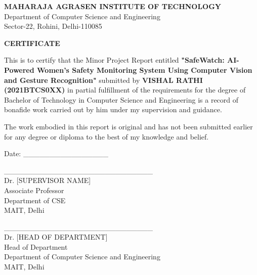 \documentclass[12pt,a4paper]{article}
\begin{document}
\newpage
\thispagestyle{empty}

\begin{center}
{\fontsize{18}{22}\bfseries MAHARAJA AGRASEN INSTITUTE OF TECHNOLOGY}\\
\vspace{0.3cm}
{\fontsize{14}{17}\selectfont Department of Computer Science and Engineering}\\
\vspace{0.5cm}
{\fontsize{14}{17}\selectfont Sector-22, Rohini, Delhi-110085}
\end{center}

\vspace{2cm}

\begin{center}
{\fontsize{16}{20}\bfseries CERTIFICATE}
\end{center}

\vspace{1.5cm}

{\fontsize{12}{15}\selectfont
This is to certify that the Minor Project Report entitled \textbf{"SafeWatch: AI-Powered Women's Safety Monitoring System Using Computer Vision and Gesture Recognition"} submitted by \textbf{VISHAL RATHI (2021BTCS0XX)} in partial fulfillment of the requirements for the degree of Bachelor of Technology in Computer Science and Engineering is a record of bonafide work carried out by him under my supervision and guidance.

\vspace{1cm}

The work embodied in this report is original and has not been submitted earlier for any degree or diploma to the best of my knowledge and belief.

\vspace{2cm}

\begin{minipage}{0.45\textwidth}
\begin{flushleft}
Date: \_\_\_\_\_\_\_\_\_\_\_\_\_\_\_\_
\end{flushleft}
\end{minipage}
\hfill
\begin{minipage}{0.45\textwidth}
\begin{flushright}
\_\_\_\_\_\_\_\_\_\_\_\_\_\_\_\_\_\_\_\_\_\_\_\_\_\_\_\_\\
Dr. [SUPERVISOR NAME]\\
Associate Professor\\
Department of CSE\\
MAIT, Delhi
\end{flushright}
\end{minipage}

\vspace{2cm}

\begin{center}
\_\_\_\_\_\_\_\_\_\_\_\_\_\_\_\_\_\_\_\_\_\_\_\_\_\_\_\_\\
Dr. [HEAD OF DEPARTMENT]\\
Head of Department\\
Department of Computer Science and Engineering\\
MAIT, Delhi
\end{center}
}
\end{document}
